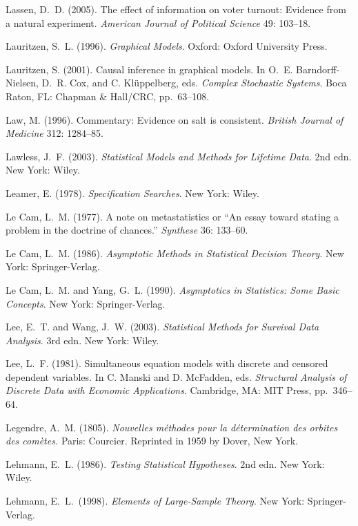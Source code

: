 \smallskip\noindent
Lassen, D.~D. (2005).
The effect of information on voter turnout: Evidence from a natural experiment.
{\it American Journal of Political Science\/} 49: 103--18.

\smallskip\noindent
Lauritzen, S.~L. (1996).
{\it Graphical Models\/}.
Oxford: Oxford University Press.

\smallskip\noindent
Lauritzen, S. (2001).
Causal inference in graphical models.
In O.~E. Barndorff-Nielsen, D.~R. Cox, and C. Kl\"uppelberg, eds.
{\it Complex Stochastic Systems\/}.
Boca Raton, FL: Chapman \& Hall/CRC, pp.~63--108.

\smallskip\noindent
Law, M. (1996).
Commentary: Evidence on salt is consistent.
{\it British Journal of Medicine\/} 312: 1284--85.

\smallskip\noindent
Lawless, J.~F. (2003). %
{\it Statistical Models and Methods for Lifetime Data\/}. 2nd edn.
New York: Wiley.

\smallskip\noindent
Leamer, E. (1978).
{\it Specification Searches\/}.
New York: Wiley.

\smallskip\noindent
Le Cam, L.~M. (1977).
A note on metastatistics or ``An essay toward stating a problem in the doctrine of chances.''
{\it Synthese\/} 36: 133--60.

\smallskip\noindent
Le Cam, L.~M. (1986).
{\it Asymptotic Methods in Statistical Decision Theory\/}.
New York: Springer-Verlag.

\smallskip\noindent
Le Cam, L.~M. and Yang, G.~L. (1990).
{\it Asymptotics in Statistics:  Some Basic Concepts\/}.
New York: Springer-Verlag.

\smallskip\noindent
Lee, E.~T. and Wang, J.~W. (2003).
{\it Statistical Methods for Survival Data Analysis\/}. 3rd edn.
New York: Wiley.

\smallskip\noindent
Lee, L.~F. (1981).
Simultaneous equation models with discrete and censored dependent variables.
In C. Manski and D. McFadden, eds.
{\it Structural Analysis of Discrete Data with Economic Applications\/}.
Cambridge, MA: MIT Press, pp.~346--64.

\smallskip\noindent
Legendre, A.~M. (1805).
{\it Nouvelles m\'ethodes pour la d\'etermination des orbites des com\`etes.\/}
Paris: Courcier.
Reprinted in 1959 by Dover, New York.

\smallskip\noindent
Lehmann, E.~L. (1986).
{\it Testing Statistical Hypotheses\/}. 2nd edn.
New York: Wiley.

\smallskip\noindent
Lehmann, E.~L.~(1998).
{\it Elements of Large-Sample Theory\/}.
New York: Sprin\-ger-Verlag.

